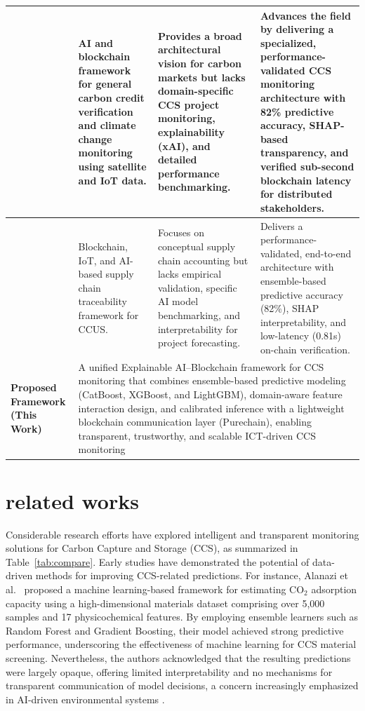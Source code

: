 \documentclass[conference]{IEEEtran}
\begin{document}
\begin{table}[htbp]
\begin{tabular}{p{1.8cm}p{4cm}p{4.8cm}p{4.5cm}}
\cite{gupta2025ai} & AI and blockchain framework for general carbon credit verification and climate change monitoring using satellite and IoT data. & Provides a broad architectural vision for carbon markets but lacks domain-specific CCS project monitoring, explainability (xAI), and detailed performance benchmarking. & Advances the field by delivering a specialized, performance-validated CCS monitoring architecture with 82\% predictive accuracy, SHAP-based transparency, and verified sub-second blockchain latency for distributed stakeholders. \\ \hline

\cite{patro2024blockchain} & Blockchain, IoT, and AI-based supply chain traceability framework for CCUS. & Focuses on conceptual supply chain accounting but lacks empirical validation, specific AI model benchmarking, and interpretability for project forecasting. & Delivers a performance-validated, end-to-end architecture with ensemble-based predictive accuracy (82\%), SHAP interpretability, and low-latency (0.81s) on-chain verification. \\
\hline

\textbf{Proposed Framework (This Work)} &
\multicolumn{3}{p{12cm}}{A unified Explainable AI–Blockchain framework for CCS monitoring that combines ensemble-based predictive modeling (CatBoost, XGBoost, and LightGBM), domain-aware feature interaction design, and calibrated inference with a lightweight blockchain communication layer (Purechain), enabling transparent, trustworthy, and scalable ICT-driven CCS monitoring} \\
\hline \toprule
\end{tabular}
\end{table}


\section{\textbf{related works}}
\label{rel}

Considerable research efforts have explored intelligent and transparent monitoring solutions for Carbon Capture and Storage (CCS), as summarized in Table~\ref{tab:compare}. Early studies have demonstrated the potential of data-driven methods for improving CCS-related predictions. For instance, Alanazi et al.~\cite{alanazi2023machine} proposed a machine learning-based framework for estimating CO$_2$ adsorption capacity using a high-dimensional materials dataset comprising over 5,000 samples and 17 physicochemical features. By employing ensemble learners such as Random Forest and Gradient Boosting, their model achieved strong predictive performance, underscoring the effectiveness of machine learning for CCS material screening. Nevertheless, the authors acknowledged that the resulting predictions were largely opaque, offering limited interpretability and no mechanisms for transparent communication of model decisions, a concern increasingly emphasized in AI-driven environmental systems \cite{priya2023artificial, yan2021harnessing}.
\end{document}
